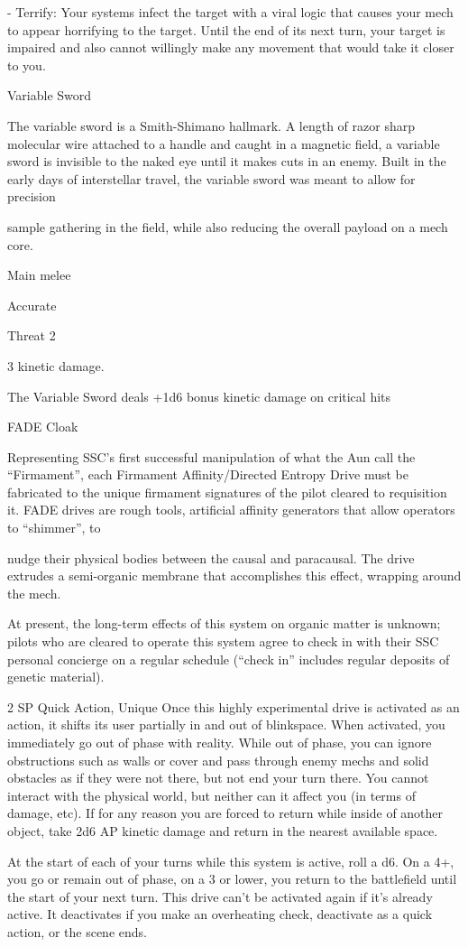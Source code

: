 	        - Terrify: Your systems infect the target with a viral logic that causes your mech to appear  
horrifying to the target. Until the end of its next turn, your target is impaired and also cannot  
willingly make any movement that would take it closer to you.
 

Variable Sword  

The variable sword is a Smith-Shimano hallmark. A length of razor sharp molecular wire attached to a  
handle and caught in a magnetic field, a variable sword is invisible to the naked eye until it makes cuts in an  
enemy. Built in the early days of interstellar travel, the variable sword was meant to allow for precision  

sample gathering in the field, while also reducing the overall payload on a mech core.   

Main melee
 
Accurate
 
Threat 2
 
3 kinetic damage.
 
The Variable Sword deals +1d6 bonus kinetic damage on critical hits
 

FADE Cloak  

                                                                                                                


Representing SSC’s first successful manipulation of what the Aun call the “Firmament”, each Firmament  
Affinity/Directed Entropy Drive must be fabricated to the unique firmament signatures of the pilot cleared to  
requisition it. FADE drives are rough tools, artificial affinity generators that allow operators to “shimmer”, to  

nudge their physical bodies between the causal and paracausal. The drive extrudes a semi-organic  
membrane that accomplishes this effect, wrapping around the mech.  

At present, the long-term effects of this system on organic matter is unknown; pilots who are cleared to  
operate this system agree to check in with their SSC personal concierge on a regular schedule (“check in”  
includes regular deposits of genetic material).  

2 SP  
Quick Action, Unique  
Once this highly experimental drive is activated as an action, it shifts its user partially in and out  
of blinkspace. When activated, you immediately go out of phase with reality. While out of phase,  
you can ignore obstructions such as walls or cover and pass through enemy mechs and solid  
obstacles as if they were not there, but not end your turn there. You cannot interact with the  
physical world, but neither can it affect you (in terms of damage, etc). If for any reason you are  
forced to return while inside of another object, take 2d6 AP kinetic damage and return in the  
nearest available space. 
 

At the start of each of your turns while this system is active, roll a d6. On a 4+, you go or remain  
out of phase, on a 3 or lower, you return to the battlefield until the start of your next turn. This  
drive can’t be activated again if it’s already active. It deactivates if you make an overheating  
check, deactivate as a quick action, or the scene ends.
 